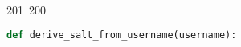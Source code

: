 201~200~\documentclass{article}
\begin{document}
\begin{lstlisting}[language=Python, caption=Key Derivation with HKDF]
	                                                                                                                                                                                                                                                                                                	                                                                                                                                        	    	                                                                                                	                                                                                                                                                                                                                                                                                                                                	                                                def derive_salt_from_username(username):
	                                                                                                                                                                                                                                                                                                	                                                                                                                                        	    	                                                                                                	                                                                                                                                                                                                                                                                                                                                	                                                    """
	                                                                                                                                                                                                                                                                                                	                                                                                                                                        	    	                                                                                                	                                                                                                                                                                                                                                                                                                                                	                                                        \brief Derives a salt from a username using HKDF.

\end{lstlisting}
\end{document}
